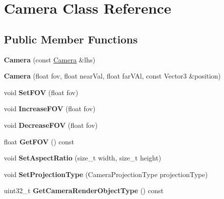 \hypertarget{classCamera}{}\section{Camera Class Reference}
\label{classCamera}
\subsection*{Public Member Functions}
\begin{DoxyCompactItemize}
\item 
\mbox{\label{classCamera_ad6ec69dd0867f0c3eea93421977af1af}} 
{\bfseries Camera} (const \hyperlink{classCamera}{Camera} \&lhs)
\item 
\mbox{\label{classCamera_ab1abbdc02f4eab52c9a5af67b4c200d7}} 
{\bfseries Camera} (float fov, float near\+Val, float far\+V\+Al, const Vector3 \&position)
\item 
\mbox{\label{classCamera_aea06aa6e65a320393f703378f46ba40f}} 
void {\bfseries Set\+F\+OV} (float fov)
\item 
\mbox{\label{classCamera_a57e39ce60794095afebda3d38b681fe9}} 
void {\bfseries Increase\+F\+OV} (float fov)
\item 
\mbox{\label{classCamera_a0d7a72fc6b726a97bc2babf0bb09550e}} 
void {\bfseries Decrease\+F\+OV} (float fov)
\item 
\mbox{\label{classCamera_aacd8360b4fb585a3cdc44ea83e55fc36}} 
float {\bfseries Get\+F\+OV} () const
\item 
\mbox{\label{classCamera_a8144951dd9ddd5557176e677fdfac282}} 
void {\bfseries Set\+Aspect\+Ratio} (size\+\_\+t width, size\+\_\+t height)
\item 
\mbox{\label{classCamera_a8757dff50ae7715a05cb24596e008021}} 
void {\bfseries Set\+Projection\+Type} (Camera\+Projection\+Type projection\+Type)
\item 
\mbox{\label{classCamera_aa2ae7a317fca3bf2278d83317251860d}} 
uint32\+\_\+t {\bfseries Get\+Camera\+Render\+Object\+Type} () const
\item 

\end{DoxyCompactItemize}
